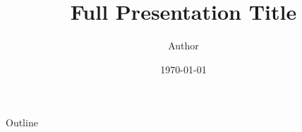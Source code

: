 \documentclass[
    11pt, %
    aspectratio=169, %
]{beamer}
\title[Abstract Title]{Full Presentation Title}
\author{Author}
\institute{Institute}
\date{\today}
\begin{document}
    \begin{frame}
        \titlepage
    \end{frame}

    \begin{frame}{Outline}
      \tableofcontents
    \end{frame}

    
    
    
    
    

    
    
\end{document}
